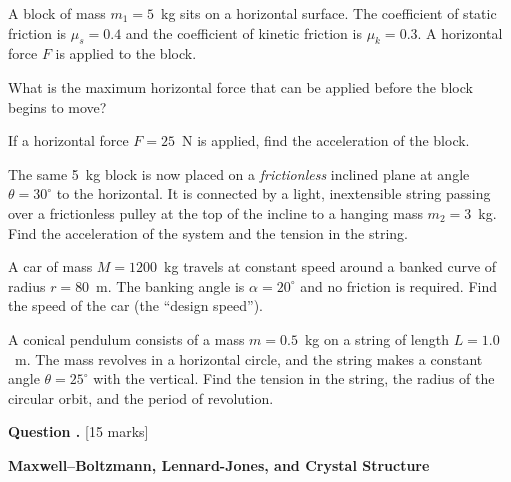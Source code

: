 \documentclass[12pt,a4paper]{article}
\newcounter{questioncounter}
\newcommand{\question}[1]{%
  \stepcounter{questioncounter}%
  \vspace{0.5cm}%
  \noindent\textbf{Question \thequestioncounter.} \hfill [#1 marks]%
  \vspace{0.2cm}%
  \par%
}
\begin{document}
\begin{parts}
\item A block of mass $m_1 = 5$~kg sits on a horizontal surface. The coefficient of static friction is $\mu_s = 0.4$ and the coefficient of kinetic friction is $\mu_k = 0.3$. A horizontal force $F$ is applied to the block.
\begin{parts}
\item What is the maximum horizontal force that can be applied before the block begins to move? 
\item If a horizontal force $F = 25$~N is applied, find the acceleration of the block. 
\end{parts}

\item The same 5~kg block is now placed on a \emph{frictionless} inclined plane at angle $\theta = 30^\circ$ to the horizontal. It is connected by a light, inextensible string passing over a frictionless pulley at the top of the incline to a hanging mass $m_2 = 3$~kg. Find the acceleration of the system and the tension in the string. 

\item A car of mass $M = 1200$~kg travels at constant speed around a banked curve of radius $r = 80$~m. The banking angle is $\alpha = 20^\circ$ and no friction is required. Find the speed of the car (the ``design speed''). 

\item A conical pendulum consists of a mass $m = 0.5$~kg on a string of length $L = 1.0$~m. The mass revolves in a horizontal circle, and the string makes a constant angle $\theta = 25^\circ$ with the vertical.
Find the tension in the string, the radius of the circular orbit, and the period of revolution. 
\end{parts}

\newpage

\question{15}

\noindent\textbf{Maxwell--Boltzmann, Lennard-Jones, and Crystal Structure}
\end{document}
